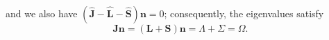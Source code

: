 and we also have $(\widehat{\mathbf J}-\widehat{\mathbf L}-\widehat{\mathbf S})\mathbf n=0$; consequently, the eigenvalues satisfy
\begin{equation}\mathbf J\mathbf n=(\mathbf L+\mathbf S)\mathbf n=\Lambda+\Sigma=\Omega.\tag{83.5}\end{equation}
